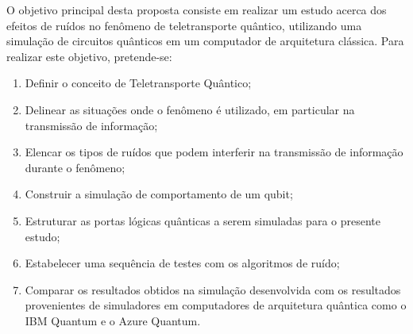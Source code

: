 \documentclass[11pt,oneside,brazil,hidelinks,article,sumario=tradicional,a4paper]{abntex2}
\begin{document}
O objetivo principal desta proposta consiste em realizar um estudo acerca dos efeitos de ruídos no fenômeno de teletransporte quântico, utilizando uma simulação de circuitos quânticos em um computador de arquitetura clássica. Para realizar este objetivo, pretende-se:
\begin{enumerate}
\item Definir o conceito de Teletransporte Quântico;
\item Delinear as situações onde o fenômeno é utilizado, em particular na transmissão de informação;
\item Elencar os tipos de ruídos que podem interferir na transmissão de informação durante o fenômeno;
\item Construir a simulação de comportamento de um qubit;
\item Estruturar as portas lógicas quânticas a serem simuladas para o presente estudo;
\item Estabelecer uma sequência de testes com os algoritmos de ruído;
\item Comparar os resultados obtidos na simulação desenvolvida com os resultados provenientes de simuladores em computadores de arquitetura quântica como o IBM Quantum e o Azure Quantum.
\end{enumerate} 






\end{document}
